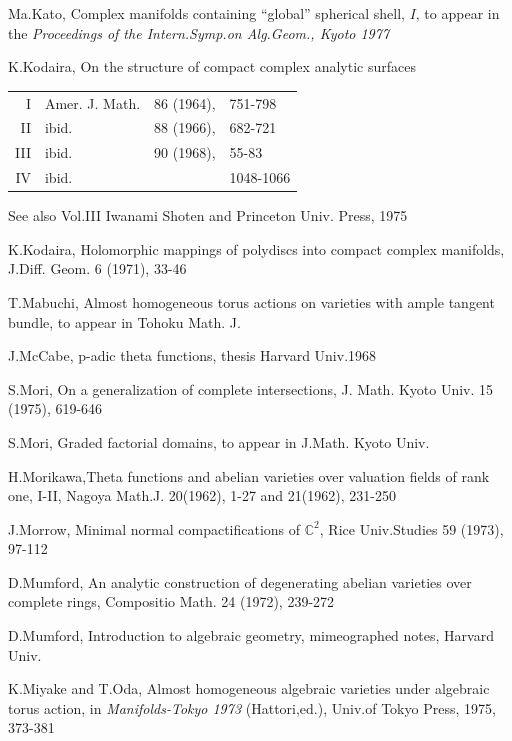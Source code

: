 \begin{thebibliography}{99}
 {Ma.Kato,} Complex manifolds containing ``global''
  spherical shell, $I$, to appear in the \textit{Proceedings of the
    Intern.Symp.on  Alg.Geom., Kyoto 1977}
 
 {K.Kodaira,} On the structure of compact complex analytic
  surfaces  

\begin{tabular}{rlll}
 I &  Amer. J. Math. & 86 (1964), &751-798\\
 II & ibid. & 88 (1966), & 682-721\\
 III & ibid. & 90 (1968), & 55-83\\
 IV & ibid. &&  1048-1066
\end{tabular}

See also  Vol.III Iwanami
Shoten and Princeton Univ. Press, 1975 

 {K.Kodaira,} Holomorphic mappings of polydiscs into
  compact complex manifolds, J.Diff. Geom. 6 (1971), 33-46  

 {T.Mabuchi,} Almost homogeneous torus actions on varieties
  with ample tangent bundle, to appear in Tohoku Math. J. 

 {J.McCabe,} p-adic theta functions, thesis Harvard
  Univ.1968   

 {S.Mori}, On a generalization of complete
  intersections, J. Math. Kyoto Univ. 15 (1975), 619-646 

 {S.Mori,} Graded factorial domains, to appear in
  J.Math. Kyoto Univ.
 
 {H.Morikawa,}\pageoriginale Theta functions and
  abelian varieties over valuation fields of rank one, I-II,
  Nagoya Math.J. 20(1962), 1-27 and 21(1962), 231-250
 
 {J.Morrow,} Minimal normal compactifications of
  $\mathbb{C}^2$, Rice Univ.Studies 59 (1973), 97-112 

 {D.Mumford,} An analytic construction of degenerating
  abelian varieties over complete rings, Compositio
  Math. 24 (1972), 239-272
 
 {D.Mumford,} Introduction to algebraic geometry,
  mimeographed notes, Harvard Univ.
 
 {K.Miyake and T.Oda,} Almost homogeneous algebraic
  varieties under algebraic torus action, in \textit{Manifolds-Tokyo
    1973} (Hattori,ed.), Univ.of Tokyo Press, 1975, 373-381
 

\end{thebibliography}

